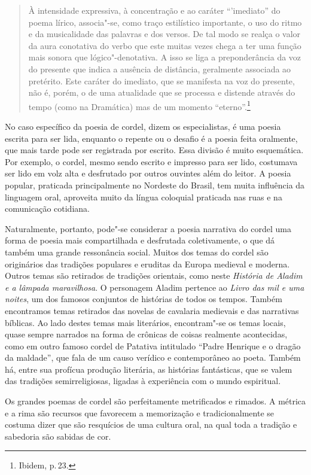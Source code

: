 \documentclass[11pt]{extarticle}
\begin{document}
\begin{quote}
À intensidade expressiva, à concentração e ao caráter ``'imediato'' do poema lírico, associa"-se, como traço estilístico importante, o uso do ritmo e da musicalidade das palavras e dos versos. De tal modo se realça o valor da aura conotativa do verbo que este muitas vezes chega a ter uma função mais sonora que lógico"-denotativa. A isso se liga a preponderância da voz do presente que indica a ausência de distância, geralmente associada ao pretérito. Este caráter do imediato, que se manifesta na voz do presente, não é, porém, o de uma atualidade que se processa e distende através do tempo (como na Dramática) mas de um momento ``eterno''.\footnote{Ibidem, p.\,23.}
\end{quote}

No caso específico da poesia de cordel, dizem os especialistas, é uma poesia escrita para
ser lida, enquanto o repente ou o desafio é a poesia feita oralmente, que mais tarde pode
ser registrada por escrito. Essa divisão é muito esquemática. Por exemplo, o
cordel, mesmo sendo escrito e impresso para ser lido, costumava ser lido em
volz alta e desfrutado por outros ouvintes além do leitor. A poesia popular,
praticada principalmente no Nordeste do Brasil, tem muita influência da
linguagem oral, aproveita muito da língua coloquial praticada nas ruas e na
comunicação cotidiana. 

Naturalmente, portanto, pode"-se considerar a poesia narrativa do cordel uma
forma de poesia mais compartilhada e desfrutada coletivamente, o que dá também
uma grande ressonância social. Muitos dos temas do cordel são originários das
tradições populares e eruditas da Europa medieval e moderna. Outros temas são
retirados de tradições orientais, como neste \textit{História de
Aladim e a lâmpada maravilhosa}. O personagem Aladim pertence ao \textit{Livro das mil
e uma noites}, um dos famosos conjuntos de histórias de todos os tempos. Também
encontramos temas retirados das novelas de cavalaria medievais e das narrativas
bíblicas. Ao lado destes temas mais literários, encontram"-se os temas locais,
quase sempre narrados na forma de crônicas de coisas realmente acontecidas,
como em outro famoso cordel de Patativa intitulado  “Padre Henrique e o dragão da maldade”, que fala de um causo verídico e contemporâneo ao poeta. Também há, entre sua profícua produção literária, as histórias
fantásticas, que se valem das tradições semirreligiosas, ligadas à experiência
com o mundo espiritual. 

Os grandes poemas de cordel são perfeitamente metrificados e rimados. A métrica
e a rima são recursos que favorecem a memorização e tradicionalmente se costuma
dizer que são resquícios de uma cultura oral, na qual toda a tradição e
sabedoria são sabidas de cor.  
\end{document}
